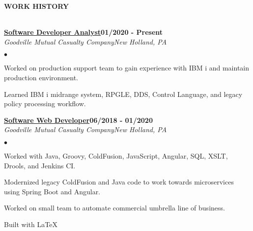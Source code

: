 \documentclass{article}
\newcommand{\lineunder}{
	\vspace*{-4pt}\\ 
	\hspace*{-18pt}\hrulefill \\
}
\newcommand{\header}[1]{
	{\hspace*{-15pt}\vspace*{6pt}\textsc{#1}}\vspace*{-6pt}\lineunder
}
\newcommand{\employer}[4]{
	{\underline{\textbf{#1}}{\hfill\textbf{#2}}\\ 
	\vspace*{2pt}\textit{#3}\hfill \textit{#4}\\}
}
\newenvironment{resumecontent}{
	\begin{list}
		{\small$\bullet$}{\topsep 0pt \itemsep -2pt}}{\vspace*{4pt}
	\end{list}
}
\newcommand{\resumeheader}[1]{
	\vspace*{10pt}
	\header{\textbf{#1}}
    \vspace*{5pt}
}
\begin{document}
	\resumeheader{WORK HISTORY}
        \employer{Software Developer Analyst}{01/2020 - Present}{Goodville Mutual Casualty Company}{New Holland, PA}
            \vspace*{2pt}
			\begin{resumecontent}
				\item Worked on production support team to gain experience with IBM i and maintain production environment.
                \item Learned IBM i midrange system, RPGLE, DDS, Control Language, and legacy policy processing workflow.
			\end{resumecontent}
            \vspace*{4pt}
		\employer{Software Web Developer}{06/2018 - 01/2020}{Goodville Mutual Casualty Company}{New Holland, PA}
            \vspace*{2pt}
			\begin{resumecontent}
				\item Worked with Java, Groovy, ColdFusion, JavaScript, Angular, SQL, XSLT, Drools, and Jenkins CI.
				\item Modernized legacy ColdFusion and Java code to work towards microservices using Spring Boot and Angular.
				\item Worked on small team to automate commercial umbrella line of business.
			\end{resumecontent}

	\begin{center}
		\small 
		\vspace*{55pt} Built with \LaTeX
	\end{center}
\end{document}
